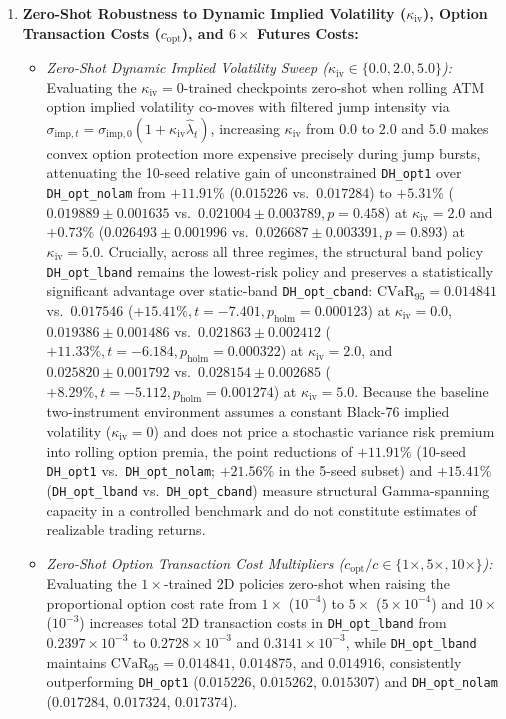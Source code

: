\documentclass[11pt,a4paper]{article}
\begin{document}
\begin{enumerate}
  \item \textbf{Zero-Shot Robustness to Dynamic Implied Volatility ($\kappa_{\text{iv}}$), Option Transaction Costs ($c_{\text{opt}}$), and $6\times$ Futures Costs:}
  \begin{itemize}
    \item \emph{Zero-Shot Dynamic Implied Volatility Sweep ($\kappa_{\text{iv}} \in \{0.0, 2.0, 5.0\}$):} Evaluating the $\kappa_{\text{iv}} = 0$-trained checkpoints zero-shot when rolling ATM option implied volatility co-moves with filtered jump intensity via $\sigma_{\text{imp},t} = \sigma_{\text{imp},0}(1 + \kappa_{\text{iv}}\hat{\lambda}_t)$, increasing $\kappa_{\text{iv}}$ from $0.0$ to $2.0$ and $5.0$ makes convex option protection more expensive precisely during jump bursts, attenuating the 10-seed relative gain of unconstrained \texttt{DH\_opt1} over \texttt{DH\_opt\_nolam} from $+11.91\%$ ($0.015226$ vs.\ $0.017284$) to $+5.31\%$ ($0.019889 \pm 0.001635$ vs.\ $0.021004 \pm 0.003789, p = 0.458$) at $\kappa_{\text{iv}} = 2.0$ and $+0.73\%$ ($0.026493 \pm 0.001996$ vs.\ $0.026687 \pm 0.003391, p = 0.893$) at $\kappa_{\text{iv}} = 5.0$. Crucially, across all three regimes, the structural band policy \texttt{DH\_opt\_lband} remains the lowest-risk policy and preserves a statistically significant advantage over static-band \texttt{DH\_opt\_cband}: $\text{CVaR}_{95} = 0.014841$ vs.\ $0.017546$ ($+15.41\%, t = -7.401, p_{\text{holm}} = 0.000123$) at $\kappa_{\text{iv}} = 0.0$, $0.019386 \pm 0.001486$ vs.\ $0.021863 \pm 0.002412$ ($+11.33\%, t = -6.184, p_{\text{holm}} = 0.000322$) at $\kappa_{\text{iv}} = 2.0$, and $0.025820 \pm 0.001792$ vs.\ $0.028154 \pm 0.002685$ ($+8.29\%, t = -5.112, p_{\text{holm}} = 0.001274$) at $\kappa_{\text{iv}} = 5.0$. Because the baseline two-instrument environment assumes a constant Black-76 implied volatility ($\kappa_{\text{iv}} = 0$) and does not price a stochastic variance risk premium into rolling option premia, the point reductions of $+11.91\%$ (10-seed \texttt{DH\_opt1} vs.\ \texttt{DH\_opt\_nolam}; $+21.56\%$ in the 5-seed subset) and $+15.41\%$ (\texttt{DH\_opt\_lband} vs.\ \texttt{DH\_opt\_cband}) measure structural Gamma-spanning capacity in a controlled benchmark and do not constitute estimates of realizable trading returns.
    \item \emph{Zero-Shot Option Transaction Cost Multipliers ($c_{\text{opt}}/c \in \{1\times, 5\times, 10\times\}$):} Evaluating the $1\times$-trained 2D policies zero-shot when raising the proportional option cost rate from $1\times$ ($10^{-4}$) to $5\times$ ($5 \times 10^{-4}$) and $10\times$ ($10^{-3}$) increases total 2D transaction costs in \texttt{DH\_opt\_lband} from $0.2397 \times 10^{-3}$ to $0.2728 \times 10^{-3}$ and $0.3141 \times 10^{-3}$, while \texttt{DH\_opt\_lband} maintains $\text{CVaR}_{95} = 0.014841$, $0.014875$, and $0.014916$, consistently outperforming \texttt{DH\_opt1} ($0.015226$, $0.015262$, $0.015307$) and \texttt{DH\_opt\_nolam} ($0.017284$, $0.017324$, $0.017374$).

\end{itemize}
\end{enumerate}
\end{document}
